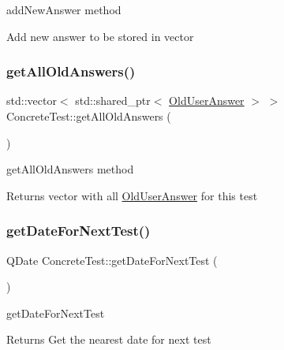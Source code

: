 add\+New\+Answer method 

Add new answer to be stored in vector \mbox{\label{class_concrete_test_a8e6c9bf328a786008c262377cfae574e}} 
\subsubsection{\texorpdfstring{get\+All\+Old\+Answers()}{getAllOldAnswers()}}
{\footnotesize\ttfamily std\+::vector$<$ std\+::shared\+\_\+ptr$<$ \hyperlink{class_old_user_answer}{Old\+User\+Answer} $>$ $>$ Concrete\+Test\+::get\+All\+Old\+Answers (\begin{DoxyParamCaption}{ }\end{DoxyParamCaption})}



get\+All\+Old\+Answers method 

\begin{DoxyReturn}{Returns}
vector with all \hyperlink{class_old_user_answer}{Old\+User\+Answer} for this test 
\end{DoxyReturn}
\mbox{\label{class_concrete_test_a1e562cde6482e0ae4d63a718c55e0fa4}} 
\subsubsection{\texorpdfstring{get\+Date\+For\+Next\+Test()}{getDateForNextTest()}}
{\footnotesize\ttfamily Q\+Date Concrete\+Test\+::get\+Date\+For\+Next\+Test (\begin{DoxyParamCaption}{ }\end{DoxyParamCaption})}



get\+Date\+For\+Next\+Test 

\begin{DoxyReturn}{Returns}
Get the nearest date for next test 
\end{DoxyReturn}
\mbox{\label{class_concrete_test_ad329e296cf5766cd2086fa2855dab307}} 
